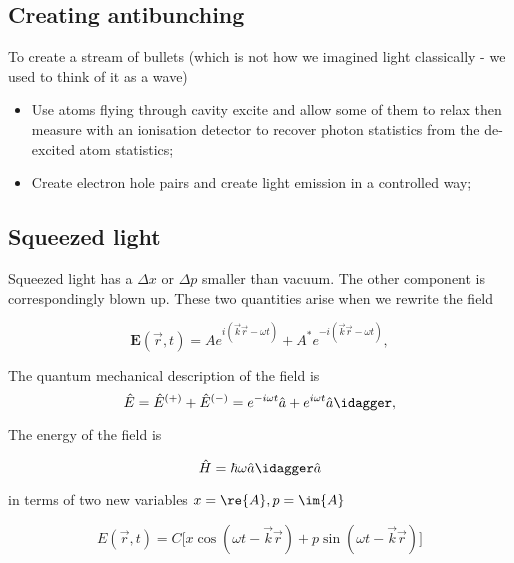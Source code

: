  \subsection{Creating antibunching}
  To create a stream of bullets (which is not how we imagined light classically - we used to think of it as a wave)
  \begin{itemize}
  	\item Use atoms flying through cavity \ra excite and allow some of them to relax \ra then measure with an ionisation detector to recover photon statistics from the de-excited atom statistics;
  	\item Create electron hole pairs and create light emission in a controlled way;
  \end{itemize}
 
 \subsection{Squeezed light}
  Squeezed light has a $ \Delta x $ or $ \Delta p $ smaller than vacuum. The other component is correspondingly blown up. These two quantities arise when we rewrite the field
  
  \begin{equation}\label{key}
  	\mathbf{E}(\vec{r},t) = Ae^{i(\vec{k}\vec{r} - \omega t)} + A^{*}e^{-i(\vec{k}\vec{r} - \omega t)},
  \end{equation}
  
  The quantum mechanical description of the field is
  \[
  	\hat{E} = \hat{E}^{(+)} + \hat{E}^{(-)} = e^{-i\omega t}\hat{a} + e^{i\omega t}\hat{a}\idagger,
  \]
  
  \noindent {} The energy of the field is
  
  \[
  	\hat{H} = \hbar\omega\hat{a}\idagger\hat{a}
  \]
  
  
  \noindent in terms of two new variables $ x = \re{A}, p =\im{A} $
  
  \begin{equation}\label{key}
  	E(\vec{r},t) = C\bigg[x\cos(\omega t - \vec{k}\vec{r}) + p\sin(\omega t - \vec{k}\vec{r})\bigg]
  \end{equation}
  
